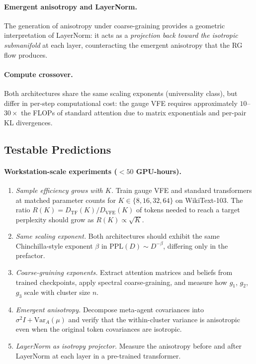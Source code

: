 \documentclass[twoside,11pt]{article}
\begin{document}
\paragraph{Emergent anisotropy and LayerNorm.}
The generation of anisotropy under coarse-graining provides a geometric interpretation of LayerNorm: it acts as a \emph{projection back toward the isotropic submanifold} at each layer, counteracting the emergent anisotropy that the RG flow produces.

\paragraph{Compute crossover.}
Both architectures share the same scaling exponents (universality class), but differ in per-step computational cost: the gauge VFE requires approximately $10$--$30\times$ the FLOPs of standard attention due to matrix exponentials and per-pair KL divergences.

\subsection{Testable Predictions}

\paragraph{Workstation-scale experiments ($<50$ GPU-hours).}
\begin{enumerate}
\item \emph{Sample efficiency grows with $K$.} Train gauge VFE and standard transformers at matched parameter counts for $K \in \{8, 16, 32, 64\}$ on WikiText-103. The ratio $R(K) = D_{\mathrm{TF}}(K) / D_{\mathrm{VFE}}(K)$ of tokens needed to reach a target perplexity should grow as $R(K) \propto \sqrt{K}$.
\item \emph{Same scaling exponent.} Both architectures should exhibit the same Chinchilla-style exponent $\beta$ in $\mathrm{PPL}(D) \sim D^{-\beta}$, differing only in the prefactor.
\item \emph{Coarse-graining exponents.} Extract attention matrices and beliefs from trained checkpoints, apply spectral coarse-graining, and measure how $g_1$, $g_2$, $g_3$ scale with cluster size $n$.
\item \emph{Emergent anisotropy.} Decompose meta-agent covariances into $\sigma^2 I + \mathrm{Var}_A(\mu)$ and verify that the within-cluster variance is anisotropic even when the original token covariances are isotropic.
\item \emph{LayerNorm as isotropy projector.} Measure the anisotropy before and after LayerNorm at each layer in a pre-trained transformer.
\end{enumerate}
\end{document}
